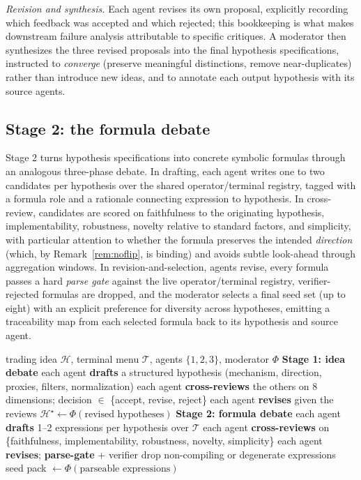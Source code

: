 \documentclass{article}
\theoremstyle{definition}
\theoremstyle{plain}
\theoremstyle{remark}
\newcommand{\Term}{\mathcal{T}}
\begin{document}
\emph{Revision and synthesis.} Each agent revises its own proposal, explicitly
recording which feedback was accepted and which rejected; this bookkeeping is what
makes downstream failure analysis attributable to specific critiques. A moderator then
synthesizes the three revised proposals into the final hypothesis specifications,
instructed to \emph{converge} (preserve meaningful distinctions, remove near-duplicates)
rather than introduce new ideas, and to annotate each output hypothesis with its source
agents.

\subsection{Stage 2: the formula debate}

Stage 2 turns hypothesis specifications into concrete symbolic formulas through an
analogous three-phase debate. In drafting, each agent writes one to two candidates per
hypothesis over the shared operator/terminal registry, tagged with a formula role and a
rationale connecting expression to hypothesis. In cross-review, candidates are scored
on faithfulness to the originating hypothesis, implementability, robustness, novelty
relative to standard factors, and simplicity, with particular attention to whether
the formula preserves the intended \emph{direction} (which, by
Remark~\ref{rem:noflip}, is binding) and avoids subtle look-ahead through aggregation
windows. In revision-and-selection, agents revise, every formula passes a hard
\emph{parse gate} against the live operator/terminal registry, verifier-rejected
formulas are dropped, and the moderator selects a final seed set (up to eight) with an
explicit preference for diversity across hypotheses, emitting a traceability map from
each selected formula back to its hypothesis and source agent.

\begin{algorithm}[h]
\caption{Two-stage debate: idea $\to$ formula (one proposal round)}
\begin{algorithmic}[1]
\Require trading idea $\mathcal{H}$, terminal menu $\Term$, agents $\{1,2,3\}$, moderator $\Phi$
\Statex \textbf{Stage 1: idea debate}
\State each agent \textbf{drafts} a structured hypothesis (mechanism, direction, proxies, filters, normalization)
\State each agent \textbf{cross-reviews} the others on 8 dimensions; decision $\in$ \{accept, revise, reject\}
\State each agent \textbf{revises} given the reviews
\State $\mathcal{H}^\star \gets \Phi(\text{revised hypotheses})$ 
\Statex \textbf{Stage 2: formula debate}
\State each agent \textbf{drafts} 1--2 expressions per hypothesis over $\Term$
\State each agent \textbf{cross-reviews} on \{faithfulness, implementability, robustness, novelty, simplicity\}
\State each agent \textbf{revises}; \textbf{parse-gate} + verifier drop non-compiling or degenerate expressions
\State \Return seed pack $\gets \Phi(\text{parseable expressions})$ 
\end{algorithmic}
\end{algorithm}
\end{document}
